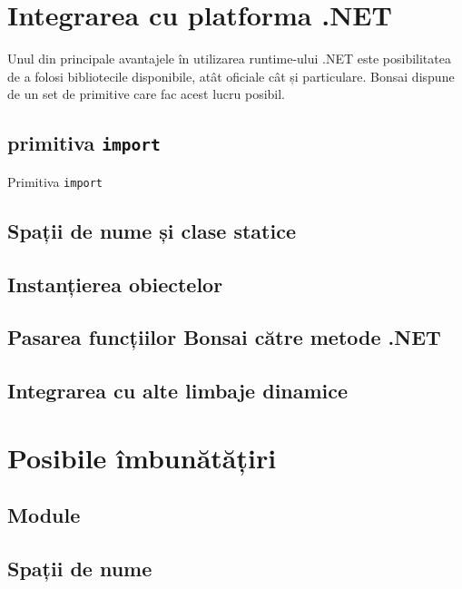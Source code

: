 \documentclass[12pt,a4paper]{memoir}
\begin{document}
\begin{itemize}

\chapter{Integrarea cu platforma .NET}

Unul din principale avantajele în utilizarea runtime-ului .NET este posibilitatea de a folosi bibliotecile disponibile, atât oficiale cât și particulare. Bonsai dispune de un set de primitive care fac acest lucru posibil.

\section{primitiva \texttt{import}}

Primitiva \texttt{import}

\section{Spații de nume și clase statice}

\section{Instanțierea obiectelor}

\section{Pasarea funcțiilor Bonsai către metode .NET}

\section{Integrarea cu alte limbaje dinamice}

\chapter{Posibile îmbunătățiri}

\section{Module}

\section{Spații de nume}


\end{itemize}
\end{document}
